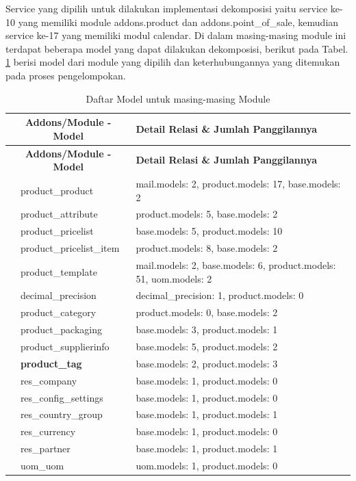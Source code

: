 \endgroup

Service yang dipilih untuk dilakukan implementasi dekomposisi yaitu  service ke-10  yang memiliki module addons.product dan addons.point{\_}of{\_}sale,  kemudian service ke-17 yang memiliki modul calendar. Di dalam masing-masing module ini terdapat beberapa model yang dapat dilakukan dekomposisi, berikut pada Tabel. \ref{tab:detail_model} berisi model dari module yang dipilih dan keterhubungannya yang ditemukan pada proses pengelompokan.

\begin{longtable}{|c|p{4cm}|p{7cm}|}
	\caption{Daftar Model untuk masing-masing Module}
	\label{tab:detail_model}\\
	\hline
	\multicolumn{2}{|c|}{\textbf{Addons/Module - Model}} &  \textbf{Detail Relasi \& Jumlah Panggilannya}\\
	\hline
	\endfirsthead
	\hline
	\multicolumn{2}{|c|}{\textbf{Addons/Module - Model}} & \textbf{Detail Relasi \& Jumlah Panggilannya}\\
	\hline
	\endhead
	\hline
	\endfoot
	\hline
	\endlastfoot

	\multirow{16}{*}{\textbf{product.models}} &  product{\_}product &  mail.models: 2, product.models: 17, base.models: 2 \\ \cline{2-3}  &  product{\_}attribute &  product.models: 5, base.models: 2 \\ \cline{2-3}  &  product{\_}pricelist &  base.models: 5, product.models: 10 \\ \cline{2-3}  &  product{\_}pricelist{\_}item &  product.models: 8, base.models: 2 \\ \cline{2-3}  &  product{\_}template &  mail.models: 2, base.models: 6, product.models: 51, uom.models: 2 \\ \cline{2-3}  &  decimal{\_}precision &  decimal{\_}precision: 1, product.models: 0 \\ \cline{2-3}  &  product{\_}category &  product.models: 0, base.models: 2 \\ \cline{2-3}  &  product{\_}packaging &  base.models: 3, product.models: 1 \\ \cline{2-3}  &  product{\_}supplierinfo &  base.models: 5, product.models: 2 \\ \cline{2-3}  &  \textbf{product{\_}tag} &  base.models: 2, product.models: 3 \\ \cline{2-3}  &  res{\_}company &  base.models: 1, product.models: 0 \\ \cline{2-3}  &  res{\_}config{\_}settings &  base.models: 1, product.models: 0 \\ \cline{2-3}  &  res{\_}country{\_}group &  base.models: 1, product.models: 1 \\ \cline{2-3}  &  res{\_}currency &  base.models: 1, product.models: 0 \\ \cline{2-3}  &  res{\_}partner &  base.models: 1, product.models: 1 \\ \cline{2-3}  &  uom{\_}uom &  uom.models: 1, product.models: 0 \\


\end{longtable}
